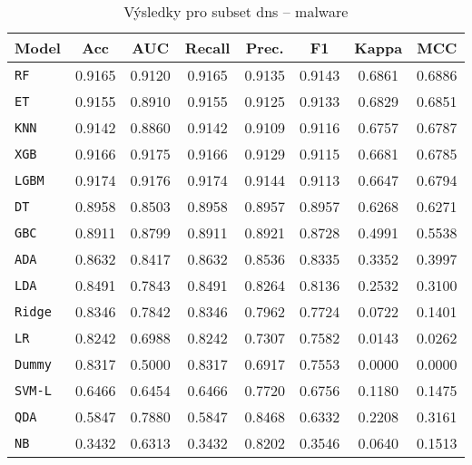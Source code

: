 \begin{table}[H]
  \centering
  \small
  \caption{Výsledky pro subset dns – malware}
  \begin{tabular}{|l|c|c|c|c|c|c|c|}
    \hline
    \textbf{Model} & \textbf{Acc} & \textbf{AUC} & \textbf{Recall} & \textbf{Prec.} & \textbf{F1} & \textbf{Kappa} & \textbf{MCC} \\
    \hline
    \texttt{RF} & 0.9165 & 0.9120 & 0.9165 & 0.9135 & 0.9143 & 0.6861 & 0.6886 \\
    \texttt{ET} & 0.9155 & 0.8910 & 0.9155 & 0.9125 & 0.9133 & 0.6829 & 0.6851 \\
    \texttt{KNN} & 0.9142 & 0.8860 & 0.9142 & 0.9109 & 0.9116 & 0.6757 & 0.6787 \\
    \texttt{XGB} & 0.9166 & 0.9175 & 0.9166 & 0.9129 & 0.9115 & 0.6681 & 0.6785 \\
    \texttt{LGBM} & 0.9174 & 0.9176 & 0.9174 & 0.9144 & 0.9113 & 0.6647 & 0.6794 \\
    \texttt{DT} & 0.8958 & 0.8503 & 0.8958 & 0.8957 & 0.8957 & 0.6268 & 0.6271 \\
    \texttt{GBC} & 0.8911 & 0.8799 & 0.8911 & 0.8921 & 0.8728 & 0.4991 & 0.5538 \\
    \texttt{ADA} & 0.8632 & 0.8417 & 0.8632 & 0.8536 & 0.8335 & 0.3352 & 0.3997 \\
    \texttt{LDA} & 0.8491 & 0.7843 & 0.8491 & 0.8264 & 0.8136 & 0.2532 & 0.3100 \\
    \texttt{Ridge} & 0.8346 & 0.7842 & 0.8346 & 0.7962 & 0.7724 & 0.0722 & 0.1401 \\
    \texttt{LR} & 0.8242 & 0.6988 & 0.8242 & 0.7307 & 0.7582 & 0.0143 & 0.0262 \\
    \texttt{Dummy} & 0.8317 & 0.5000 & 0.8317 & 0.6917 & 0.7553 & 0.0000 & 0.0000 \\
    \texttt{SVM-L} & 0.6466 & 0.6454 & 0.6466 & 0.7720 & 0.6756 & 0.1180 & 0.1475 \\
    \texttt{QDA} & 0.5847 & 0.7880 & 0.5847 & 0.8468 & 0.6332 & 0.2208 & 0.3161 \\
    \texttt{NB} & 0.3432 & 0.6313 & 0.3432 & 0.8202 & 0.3546 & 0.0640 & 0.1513 \\
    \hline
  \end{tabular}
\end{table}
\vspace{0.5cm}

